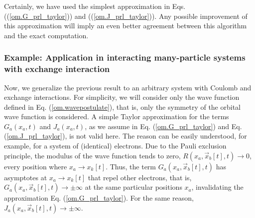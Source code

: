\documentclass[onecolumn,nofootinbib, secnumarabic, amsmath, nobibnotes,11pt,aps,pra]{revtex4-1}
\newcommand{\pref}[1]{(\ref{#1})}
\newcommand{\eref}[1]{Eq. (\ref{#1})}
\begin{document}
Certainly, we have used the simplest approximation in Eqs. (\pref{om.G_prl_taylor}) and (\pref{om.J_prl_taylor}). Any possible improvement of this approximation will imply an even better agreement between this algorithm and the exact computation.

\subsubsection{Example: Application in interacting many-particle systems with exchange interaction}

Now, we generalize the previous result to an arbitrary system with
Coulomb and exchange interactions. For simplicity, we will consider
only the wave function defined in \eref{om.wavepostulate}, that is,
only the symmetry of the orbital wave function is considered. A
simple Taylor approximation for the terms \textit{$G_{a}(x_a,t)$}
and \textit{$J_{a}(x_a,t)$}, as we assume in \eref{om.G_prl_taylor}
and \eref{om.J_prl_taylor}, is not valid here. The reason can be
easily understood, for example, for a system of (identical)
electrons. Due to the Pauli exclusion principle, the modulus of the
wave function tends to zero, $R({{x}_{a}},{{\vec{x}}_{b}}[t],t)\to
0$, every position where ${{x}_{a}}\to {{x}_{k}}[t]$. Thus, the term
\textit{${{G}_{a}}({{x}_{a}},{{\vec{x}}_{b}}[t],t)$} has asymptotes
at ${{x}_{a}}\to {{x}_{k}}[t]$ that repel other electrons, that is,
${G}_{a}({{x}_{a}},{{\vec{x}}_{b}}[t],t) \to \pm \infty $ at the
same particular positions $x_a$, invalidating the approximation
\eref{om.G_prl_taylor}. For the same reason,
${J}_{a}({{x}_{a}},{{\vec{x}}_{b}}[t],t) \to \pm \infty $.
\end{document}
